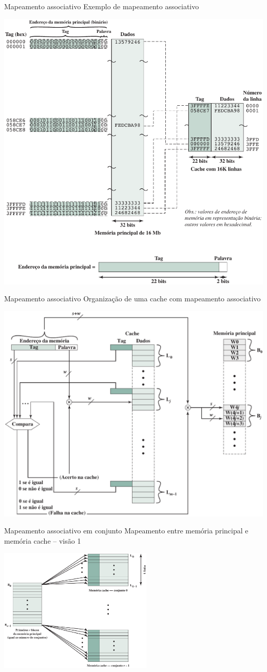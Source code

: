 \begin{slide}{Mapeamento associativo}
	Exemplo de mapeamento associativo
	\begin{center}
		\includegraphics[height=0.5\textwidth]{figs/exemplo-associativo}
	\end{center}
\end{slide}

\begin{slide}{Mapeamento associativo}
	Organização de uma cache com mapeamento associativo
	\begin{center}
		\includegraphics[height=0.5\textwidth]{figs/organizacao-associativo}
	\end{center}
\end{slide}

\begin{slide}{Mapeamento associativo em conjunto}
	Mapeamento entre memória principal e memória cache -- visão 1
	\begin{center}
		\includegraphics[width=0.55\textwidth]{figs/associativo-conj-01}
	\end{center}
\end{slide}

